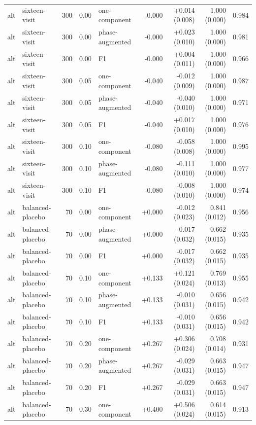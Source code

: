 \documentclass[
  11pt,
]{article}
\begin{document}
\begin{longtable}[t]{llrrlrrrr}
alt & sixteen-visit & 300 & 0.00 & one-component & -0.000 & +0.014 (0.008) & 1.000 (0.000) & 0.984\\
alt & sixteen-visit & 300 & 0.00 & phase-augmented & -0.000 & +0.023 (0.010) & 1.000 (0.000) & 0.981\\
\addlinespace
alt & sixteen-visit & 300 & 0.00 & F1 & -0.000 & +0.004 (0.011) & 1.000 (0.000) & 0.966\\
alt & sixteen-visit & 300 & 0.05 & one-component & -0.040 & -0.012 (0.009) & 1.000 (0.000) & 0.987\\
alt & sixteen-visit & 300 & 0.05 & phase-augmented & -0.040 & -0.040 (0.010) & 1.000 (0.000) & 0.971\\
alt & sixteen-visit & 300 & 0.05 & F1 & -0.040 & +0.017 (0.010) & 1.000 (0.000) & 0.976\\
alt & sixteen-visit & 300 & 0.10 & one-component & -0.080 & -0.058 (0.008) & 1.000 (0.000) & 0.995\\
\addlinespace
alt & sixteen-visit & 300 & 0.10 & phase-augmented & -0.080 & -0.111 (0.010) & 1.000 (0.000) & 0.977\\
alt & sixteen-visit & 300 & 0.10 & F1 & -0.080 & -0.008 (0.010) & 1.000 (0.000) & 0.974\\
alt & balanced-placebo & 70 & 0.00 & one-component & +0.000 & -0.012 (0.023) & 0.841 (0.012) & 0.956\\
alt & balanced-placebo & 70 & 0.00 & phase-augmented & +0.000 & -0.017 (0.032) & 0.662 (0.015) & 0.935\\
alt & balanced-placebo & 70 & 0.00 & F1 & +0.000 & -0.017 (0.032) & 0.662 (0.015) & 0.935\\
\addlinespace
alt & balanced-placebo & 70 & 0.10 & one-component & +0.133 & +0.121 (0.024) & 0.769 (0.013) & 0.955\\
alt & balanced-placebo & 70 & 0.10 & phase-augmented & +0.133 & -0.010 (0.031) & 0.656 (0.015) & 0.942\\
alt & balanced-placebo & 70 & 0.10 & F1 & +0.133 & -0.010 (0.031) & 0.656 (0.015) & 0.942\\
alt & balanced-placebo & 70 & 0.20 & one-component & +0.267 & +0.306 (0.024) & 0.708 (0.014) & 0.931\\
alt & balanced-placebo & 70 & 0.20 & phase-augmented & +0.267 & -0.029 (0.031) & 0.663 (0.015) & 0.947\\
\addlinespace
alt & balanced-placebo & 70 & 0.20 & F1 & +0.267 & -0.029 (0.031) & 0.663 (0.015) & 0.947\\
alt & balanced-placebo & 70 & 0.30 & one-component & +0.400 & +0.506 (0.024) & 0.614 (0.015) & 0.913\\

\end{longtable}
\end{document}
